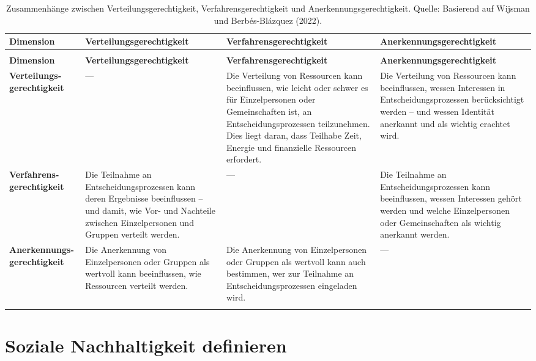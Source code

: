 \documentclass[
  nswissgerman,
  a4paper,
  DIV=11,
  numbers=noendperiod,
  oneside,
  openany]{scrreprt}
\begin{document}
\begin{longtable}[t]{>{\raggedright\arraybackslash}p{1.6cm}>{\raggedright\arraybackslash}p{3.25cm}>{\raggedright\arraybackslash}p{3.25cm}>{\raggedright\arraybackslash}p{3.25cm}}

\caption{\label{tbl-justice}Zusammenhänge zwischen
Verteilungsgerechtigkeit, Verfahrensgerechtigkeit und
Anerkennungsgerechtigkeit. Quelle: Basierend auf Wijsman und
Berbés-Blázquez (2022).}

\tabularnewline

\toprule
\textbf{Dimension} & \textbf{Verteilungsgerechtigkeit} & \textbf{Verfahrensgerechtigkeit} & \textbf{Anerkennungsgerechtigkeit}\\
\midrule
\endfirsthead
\multicolumn{4}{@{}l}{\textit{(continued)}}\\
\toprule
\textbf{Dimension} & \textbf{Verteilungsgerechtigkeit} & \textbf{Verfahrensgerechtigkeit} & \textbf{Anerkennungsgerechtigkeit}\\
\midrule
\endhead

\endfoot
\bottomrule
\endlastfoot
\textbf{Verteilungs­gerechtigkeit} & — & Die Verteilung von Ressourcen kann beeinflussen, wie leicht oder schwer es für Einzelpersonen oder Gemeinschaften ist, an Entscheidungsprozessen teilzunehmen. Dies liegt daran, dass Teilhabe Zeit, Energie und finanzielle Ressourcen erfordert. & Die Verteilung von Ressourcen kann beeinflussen, wessen Interessen in Entscheidungsprozessen berücksichtigt werden -- und wessen Identität anerkannt und als wichtig erachtet wird.\\
\textbf{Verfahrens­gerechtigkeit} & Die Teilnahme an Entscheidungsprozessen kann deren Ergebnisse beeinflussen -- und damit, wie Vor- und Nachteile zwischen Einzelpersonen und Gruppen verteilt werden. & — & Die Teilnahme an Entscheidungsprozessen kann beeinflussen, wessen Interessen gehört werden und welche Einzelpersonen oder Gemeinschaften als wichtig anerkannt werden.\\
\textbf{Anerkennungs­gerechtigkeit} & Die Anerkennung von Einzelpersonen oder Gruppen als wertvoll kann beeinflussen, wie Ressourcen verteilt werden. & Die Anerkennung von Einzelpersonen oder Gruppen als wertvoll kann auch bestimmen, wer zur Teilnahme an Entscheidungsprozessen eingeladen wird. & —\\*

\end{longtable}

\endgroup{}

\section{Soziale Nachhaltigkeit
definieren}\label{soziale-nachhaltigkeit-definieren}
\end{document}
